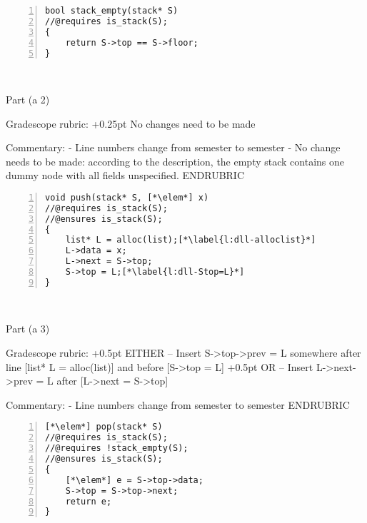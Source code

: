 \begin{parts}
\enlargethispage{5ex}
\begin{lstlisting}[numbers=left, name=stack]
bool stack_empty(stack* S)
//@requires is_stack(S);
{
    return S->top == S->floor;
}

\end{lstlisting}
\begin{framed}
\else~\vspace{2.0in}\fi
\end{framed}

\RUBRIC
Part (a 2)

Gradescope rubric:
+0.25pt No changes need to be made

Commentary:
- Line numbers change from semester to semester
- No change needs to be made: according to the description, the
  empty stack contains one dummy node with all fields unspecified.
ENDRUBRIC

\newpage
\begin{lstlisting}[numbers=left, name=stack]
void push(stack* S, [*\elem*] x)
//@requires is_stack(S);
//@ensures is_stack(S);
{
    list* L = alloc(list);[*\label{l:dll-alloclist}*]
    L->data = x;
    L->next = S->top;
    S->top = L;[*\label{l:dll-Stop=L}*]
}

\end{lstlisting}
\begin{framed}
\else~\vspace{2.0in}\fi
\end{framed}

\RUBRIC
Part (a 3)

Gradescope rubric:
+0.5pt EITHER -- Insert S->top->prev = L somewhere after line [list* L = alloc(list)] and before [S->top = L]
+0.5pt OR -- Insert L->next->prev = L after [L->next = S->top]

Commentary:
- Line numbers change from semester to semester
ENDRUBRIC

\begin{lstlisting}[numbers=left, name=stack]
[*\elem*] pop(stack* S)
//@requires is_stack(S);
//@requires !stack_empty(S);
//@ensures is_stack(S);
{
    [*\elem*] e = S->top->data;
    S->top = S->top->next;
    return e;
}

\end{lstlisting}
\begin{framed}
\else~\vspace{2.0in}\fi
\end{framed}


\end{parts}
